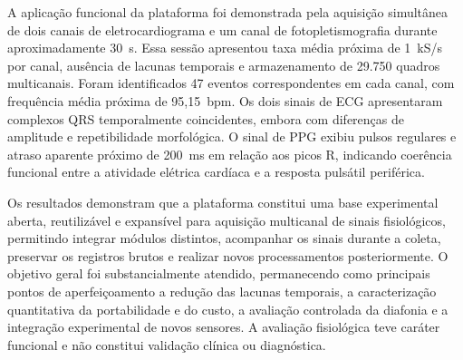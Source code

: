 \documentclass[a4paper,12pt]{fcte}
\begin{document}
\begin{resumo}
A aplicação funcional da plataforma foi demonstrada pela aquisição simultânea de dois canais de eletrocardiograma e um canal de fotopletismografia durante aproximadamente 30~s. Essa sessão apresentou taxa média próxima de 1~kS/s por canal, ausência de lacunas temporais e armazenamento de 29.750 quadros multicanais. Foram identificados 47 eventos correspondentes em cada canal, com frequência média próxima de 95,15~bpm. Os dois sinais de ECG apresentaram complexos QRS temporalmente coincidentes, embora com diferenças de amplitude e repetibilidade morfológica. O sinal de PPG exibiu pulsos regulares e atraso aparente próximo de 200~ms em relação aos picos R, indicando coerência funcional entre a atividade elétrica cardíaca e a resposta pulsátil periférica.

Os resultados demonstram que a plataforma constitui uma base experimental aberta, reutilizável e expansível para aquisição multicanal de sinais fisiológicos, permitindo integrar módulos distintos, acompanhar os sinais durante a coleta, preservar os registros brutos e realizar novos processamentos posteriormente. O objetivo geral foi substancialmente atendido, permanecendo como principais pontos de aperfeiçoamento a redução das lacunas temporais, a caracterização quantitativa da portabilidade e do custo, a avaliação controlada da diafonia e a integração experimental de novos sensores. A avaliação fisiológica teve caráter funcional e não constitui validação clínica ou diagnóstica.

\end{resumo}
\end{document}
